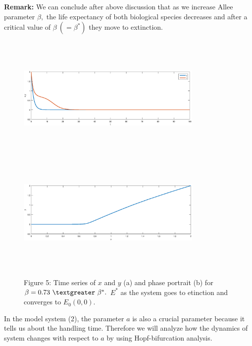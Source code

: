 \documentclass[a4paper, 10pt]{article}
\begin{document}
\textbf{Remark:} We can conclude after above discussion that as we increase Allee parameter $\beta,$ the life expectancy of both biological species decreases and after a critical value of $\beta~(=\beta^*)$ they move to extinction. 
\begin{figure}[H]
	{\includegraphics[width=9cm, height=6cm]{11.eps}}
	\endminipage\hfill
	{\includegraphics[width=9cm, height=6cm]{12.eps}}
	\endminipage\hfill
	\begin{center} Figure 5: Time series of $x$ and $y$ (a) and phase portrait (b) for $\beta=0.73~\textgreater~\beta^*.$ $E^*$ as the system goes to etinction and converges to $E_0(0,0).$    \end{center}
\end{figure}
In the model system (2), the parameter $a$ is also a crucial parameter because it tells us about the handling time. Therefore we will analyze how the dynamics of system changes with respect to $a$ by using Hopf-bifurcation analysis.
\end{document}
